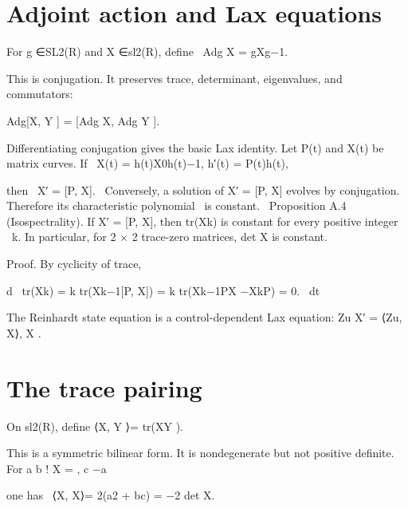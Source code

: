 \section{Adjoint action and Lax equations}

\begin{displaytext}
For g ∈SL2(R) and X ∈sl2(R), define \
Adg X = gXg−1.
\end{displaytext}

This is conjugation. It preserves trace, determinant, eigenvalues, and commutators:


Adg[X, Y ] = [Adg X, Adg Y ].


\begin{displaytext}
Differentiating conjugation gives the basic Lax identity. Let P(t) and X(t) be matrix curves. If \
X(t) = h(t)X0h(t)−1, h′(t) = P(t)h(t),
\end{displaytext}

\begin{displaytext}
then \
X′ = [P, X]. \
Conversely, a solution of X′ = [P, X] evolves by conjugation. Therefore its characteristic polynomial \
is constant. \
Proposition A.4 (Isospectrality). If X′ = [P, X], then tr(Xk) is constant for every positive integer \
k. In particular, for 2 × 2 trace-zero matrices, det X is constant.
\end{displaytext}

\begin{prooftext}
Proof. By cyclicity of trace,
\end{prooftext}

\begin{displaytext}
d \
tr(Xk) = k tr(Xk−1[P, X]) = k tr(Xk−1PX −XkP) = 0. \
dt
\end{displaytext}

The Reinhardt state equation is a control-dependent Lax equation: Zu X′ = ⟨Zu, X⟩, X .


\section{The trace pairing}

On sl2(R), define ⟨X, Y ⟩= tr(XY ).


This is a symmetric bilinear form. It is nondegenerate but not positive definite. For a b ! X = , c −a


\begin{displaytext}
one has \
⟨X, X⟩= 2(a2 + bc) = −2 det X.
\end{displaytext}

